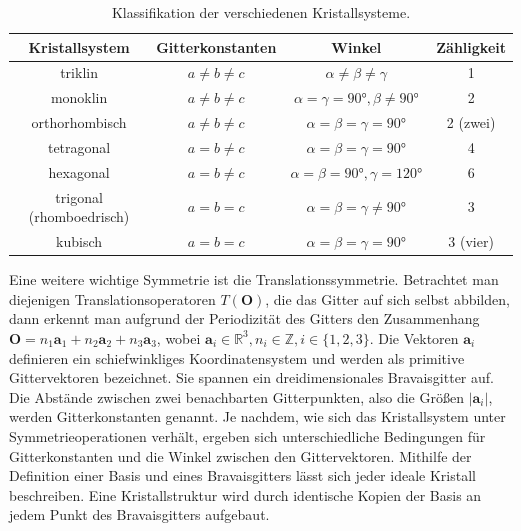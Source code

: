 \begin{table}[h]
    \centering
    \begin{tabular}{c c c c}
        \toprule
        Kristallsystem           & Gitterkonstanten  & Winkel                                       & Zähligkeit \\ \midrule
        triklin                  & $a \neq b \neq c$ & $\alpha \neq\beta \neq\gamma$                & 1          \\
        monoklin                 & $a \neq b \neq c$ & $\alpha=\gamma=\ang{90},\beta \neq \ang{90}$ & 2          \\
        orthorhombisch           & $a \neq b \neq c$ & $\alpha=\beta=\gamma=\ang{90}$               & 2 (zwei)   \\
        tetragonal               & $a = b \neq c$    & $\alpha=\beta=\gamma=\ang{90}$               & 4          \\
        hexagonal                & $a = b \neq c$    & $\alpha=\beta=\ang{90}, \gamma=\ang{120}$    & 6          \\
        trigonal (rhomboedrisch) & $a=b=c$           & $\alpha=\beta=\gamma \neq \ang{90}$          & 3          \\
        kubisch                  & $a=b=c$           & $\alpha=\beta=\gamma=\ang{90}$               & 3 (vier)   \\ \bottomrule
    \end{tabular}
    \caption{Klassifikation der verschiedenen Kristallsysteme.  }
    \label{tab:krystallsysteme}
\end{table}

Eine weitere wichtige Symmetrie ist die Translationssymmetrie.
Betrachtet man diejenigen Translationsoperatoren $T(\mathbf{O})$, die das Gitter auf sich selbst abbilden, dann erkennt
man aufgrund der Periodizität des Gitters den Zusammenhang
$\mathbf{O} = n_{1}\mathbf{a}_{1}+n_{2}\mathbf{a}_{2}+n_{3}\mathbf{a}_{3}$, wobei
$\mathbf{a}_{i}\in\mathbb{R}^{3}, n_{i}\in\mathbb{Z}, i\in \{1,2,3\}$. \autocite[50]{Hunklinger}
Die Vektoren $\mathbf{a}_{i}$
definieren ein schiefwinkliges Koordinatensystem und werden als primitive Gittervektoren bezeichnet.
Sie spannen ein dreidimensionales Bravaisgitter auf.
Die Abstände zwischen zwei benachbarten Gitterpunkten, also die Größen
$\lvert \mathbf{a}_{i} \rvert$, werden Gitterkonstanten genannt. \autocite[82]{Ashcroft}
Je nachdem, wie sich das Kristallsystem unter Symmetrieoperationen verhält, ergeben sich unterschiedliche Bedingungen für
Gitterkonstanten und die Winkel zwischen den Gittervektoren.
Mithilfe der Definition einer Basis und eines Bravaisgitters lässt sich jeder ideale Kristall beschreiben.
Eine Kristallstruktur wird durch identische Kopien der Basis an jedem Punkt des Bravaisgitters aufgebaut.
\autocite[94-95]{Ashcroft}

